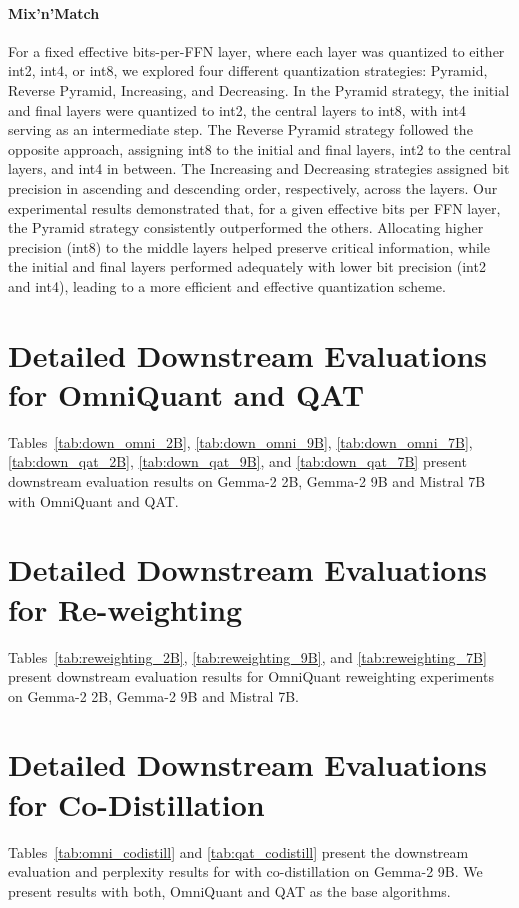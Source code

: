 \paragraph{Mix'n'Match} For a fixed effective bits-per-FFN layer, where each layer was quantized to either int2, int4, or int8, we explored four different quantization strategies: Pyramid, Reverse Pyramid, Increasing, and Decreasing. In the Pyramid strategy, the initial and final layers were quantized to int2, the central layers to int8, with int4 serving as an intermediate step. The Reverse Pyramid strategy followed the opposite approach, assigning int8 to the initial and final layers, int2 to the central layers, and int4 in between. The Increasing and Decreasing strategies assigned bit precision in ascending and descending order, respectively, across the layers. Our experimental results demonstrated that, for a given effective bits per FFN layer, the Pyramid strategy consistently outperformed the others. Allocating higher precision (int8) to the middle layers helped preserve critical information, while the initial and final layers performed adequately with lower bit precision (int2 and int4), leading to a more efficient and effective quantization scheme.

\section{Detailed Downstream Evaluations for OmniQuant and QAT}
Tables~\ref{tab:down_omni_2B}, \ref{tab:down_omni_9B}, \ref{tab:down_omni_7B}, \ref{tab:down_qat_2B}, \ref{tab:down_qat_9B}, and \ref{tab:down_qat_7B} present downstream evaluation results on Gemma-2 2B, Gemma-2 9B and Mistral 7B with OmniQuant and QAT.



\section{Detailed Downstream Evaluations for \alg Re-weighting}
Tables~\ref{tab:reweighting_2B}, \ref{tab:reweighting_9B}, and \ref{tab:reweighting_7B} present downstream evaluation results for OmniQuant reweighting experiments on Gemma-2 2B, Gemma-2 9B and Mistral 7B.




\section{Detailed Downstream Evaluations for Co-Distillation}
Tables~\ref{tab:omni_codistill} and \ref{tab:qat_codistill} present the downstream evaluation and perplexity results for \alg with co-distillation on Gemma-2 9B. We present results with both, OmniQuant and QAT as the base algorithms. 



